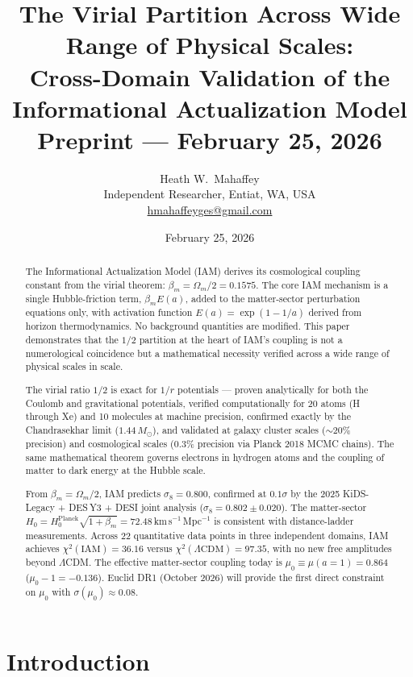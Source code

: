 \documentclass[12pt,a4paper]{article}
\title{\textbf{The Virial Partition Across Wide Range of Physical Scales:}\\
\textbf{Cross-Domain Validation of the Informational Actualization Model}\\[0.5em]
\large Preprint --- February 25, 2026}
\author{Heath W.\ Mahaffey\\
\small Independent Researcher, Entiat, WA, USA\\
\small \href{mailto:hmahaffeyges@gmail.com}{hmahaffeyges@gmail.com}}
\date{February 25, 2026}
\begin{document}
\maketitle

\begin{abstract}
The Informational Actualization Model (IAM) derives its cosmological coupling constant
from the virial theorem: $\beta_m = \Omega_m/2 = 0.1575$. The core IAM mechanism is a
single Hubble-friction term, $\beta_m E(a)$, added to the matter-sector perturbation
equations only, with activation function $E(a) = \exp(1 - 1/a)$ derived from
horizon thermodynamics. No background quantities are modified. This paper demonstrates
that the $1/2$ partition at the heart of IAM's coupling is not a numerological
coincidence but a mathematical necessity verified across a wide range of physical scales in scale.

The virial ratio $1/2$ is exact for $1/r$ potentials --- proven analytically for both
the Coulomb and gravitational potentials, verified computationally for 20 atoms
(H through Xe) and 10 molecules at machine precision, confirmed exactly by the
Chandrasekhar limit ($1.44\,M_\odot$), and validated at galaxy cluster scales
(${\sim}20\%$ precision) and cosmological scales ($0.3\%$ precision via
Planck 2018 MCMC chains). The same mathematical theorem governs electrons in hydrogen
atoms and the coupling of matter to dark energy at the Hubble scale.

From $\beta_m = \Omega_m/2$, IAM predicts $\sigma_8 = 0.800$, confirmed at $0.1\sigma$
by the 2025 KiDS-Legacy + DES\,Y3 + DESI joint analysis ($\sigma_8 = 0.802 \pm 0.020$).
The matter-sector $H_0 = H_0^{\mathrm{Planck}}\sqrt{1+\beta_m} = 72.48$\,km\,s$^{-1}$\,Mpc$^{-1}$
is consistent with distance-ladder measurements. Across 22 quantitative data points in
three independent domains, IAM achieves $\chi^2(\mathrm{IAM}) = 36.16$ versus
$\chi^2(\Lambda\mathrm{CDM}) = 97.35$, with no new free amplitudes beyond $\Lambda$CDM.
The effective matter-sector coupling today is $\mu_0 \equiv \mu(a{=}1) = 0.864$
($\mu_0 - 1 = -0.136$). Euclid DR1 (October 2026) will provide the first direct
constraint on $\mu_0$ with $\sigma(\mu_0) \approx 0.08$.
\end{abstract}

\section{Introduction}
\end{document}
